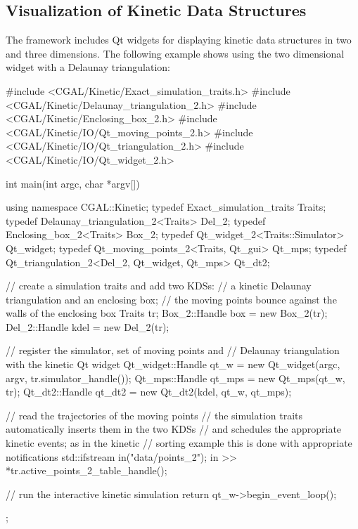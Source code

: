 

\subsection{Visualization of Kinetic Data Structures\label{sec:kds_delaunay_2_example}}


The framework includes Qt widgets for displaying kinetic data
structures in two and three dimensions. The following example shows
using the two dimensional widget with a Delaunay triangulation:

\begin{ccExampleCode}
#include <CGAL/Kinetic/Exact_simulation_traits.h>
#include <CGAL/Kinetic/Delaunay_triangulation_2.h>
#include <CGAL/Kinetic/Enclosing_box_2.h>
#include <CGAL/Kinetic/IO/Qt_moving_points_2.h>
#include <CGAL/Kinetic/IO/Qt_triangulation_2.h>
#include <CGAL/Kinetic/IO/Qt_widget_2.h>

int main(int argc, char *argv[]) {
    using namespace CGAL::Kinetic;
    typedef Exact_simulation_traits Traits;
    typedef Delaunay_triangulation_2<Traits> Del_2;
    typedef Enclosing_box_2<Traits> Box_2;
    typedef Qt_widget_2<Traits::Simulator> Qt_widget;
    typedef Qt_moving_points_2<Traits, Qt_gui> Qt_mps;
    typedef Qt_triangulation_2<Del_2, Qt_widget, Qt_mps> Qt_dt2;
    
    // create a simulation traits and add two KDSs:
    // a kinetic Delaunay triangulation and an enclosing box;
    // the moving points bounce against the walls of the enclosing box
    Traits tr;
    Box_2::Handle box = new Box_2(tr);
    Del_2::Handle kdel = new Del_2(tr);

    // register the simulator, set of moving points and
    // Delaunay triangulation with the kinetic Qt widget
    Qt_widget::Handle qt_w = new Qt_widget(argc, argv, tr.simulator_handle());
    Qt_mps::Handle qt_mps = new Qt_mps(qt_w, tr);
    Qt_dt2::Handle qt_dt2 = new Qt_dt2(kdel, qt_w, qt_mps);

    // read the trajectories of the moving points
    //  the simulation traits automatically inserts them in the two KDSs
    // and schedules the appropriate kinetic events; as in the kinetic
    // sorting example this is done with appropriate notifications
    std::ifstream in("data/points_2");    
    in  >> *tr.active_points_2_table_handle();

    // run the interactive kinetic simulation
    return qt_w->begin_event_loop();
};
\end{ccExampleCode}

